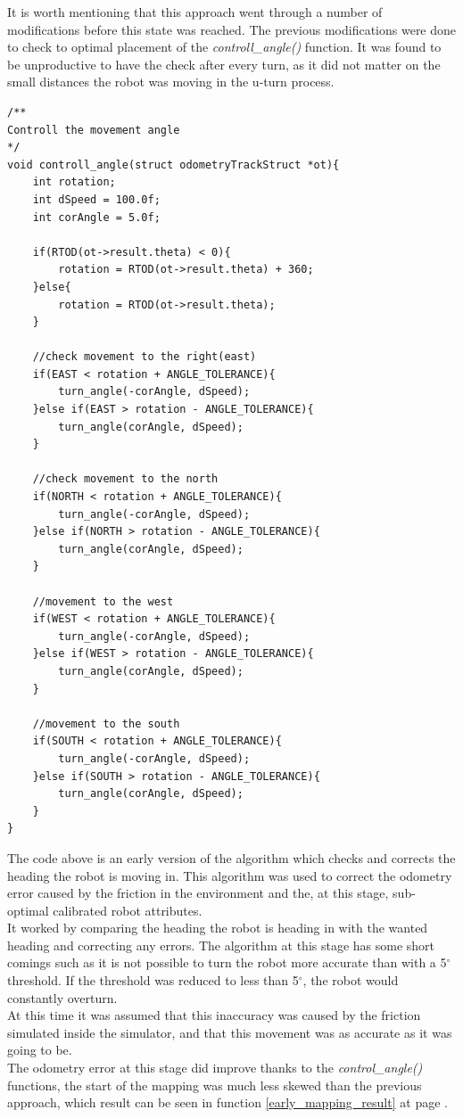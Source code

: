 \begin{flushleft}
It is worth mentioning that this approach went through a number of modifications before this state was reached. The previous modifications were done to check to optimal placement of the \textit{controll\_angle()} function. It was found to be unproductive to have the check after every turn, as it did not matter on the small distances the robot was moving in the u-turn process. \\

\begin{lstlisting}[caption={Early heading correction algorithm}]
 /**
Controll the movement angle
*/
void controll_angle(struct odometryTrackStruct *ot){
	int rotation;
	int dSpeed = 100.0f;
	int corAngle = 5.0f;

	if(RTOD(ot->result.theta) < 0){
		rotation = RTOD(ot->result.theta) + 360;
	}else{
		rotation = RTOD(ot->result.theta);
	}

	//check movement to the right(east)
	if(EAST < rotation + ANGLE_TOLERANCE){
		turn_angle(-corAngle, dSpeed);
	}else if(EAST > rotation - ANGLE_TOLERANCE){
		turn_angle(corAngle, dSpeed);
	}

	//check movement to the north
	if(NORTH < rotation + ANGLE_TOLERANCE){
		turn_angle(-corAngle, dSpeed);
	}else if(NORTH > rotation - ANGLE_TOLERANCE){
		turn_angle(corAngle, dSpeed);
	}

	//movement to the west
	if(WEST < rotation + ANGLE_TOLERANCE){
		turn_angle(-corAngle, dSpeed);
	}else if(WEST > rotation - ANGLE_TOLERANCE){
		turn_angle(corAngle, dSpeed);
	}

	//movement to the south
	if(SOUTH < rotation + ANGLE_TOLERANCE){
		turn_angle(-corAngle, dSpeed);
	}else if(SOUTH > rotation - ANGLE_TOLERANCE){
		turn_angle(corAngle, dSpeed);
	}
}
\end{lstlisting}
The code above is an early version of the algorithm which checks and corrects the heading the robot is moving in. This algorithm was used to correct the odometry error caused by the friction in the environment and the, at this stage, sub-optimal calibrated robot attributes. \\
It worked by comparing the heading the robot is heading in with the wanted heading and correcting any errors. The algorithm at this stage has some short comings such as it is not possible to turn the robot more accurate than with a 5$^{\circ}$ threshold. If the threshold was reduced to less than  5$^{\circ}$, the robot would constantly overturn. \\[3ex]

At this time it was assumed that this inaccuracy was caused by the friction simulated inside the simulator, and that this movement was as accurate as it was going to be. \\
The odometry error at this stage did improve thanks to the \textit{control\_angle()} functions, the start of the mapping was much less skewed than the previous approach, which result can be seen in function \ref{early_mapping_result} at page \pageref{early_mapping_result}. \\[3ex]


\end{flushleft}
